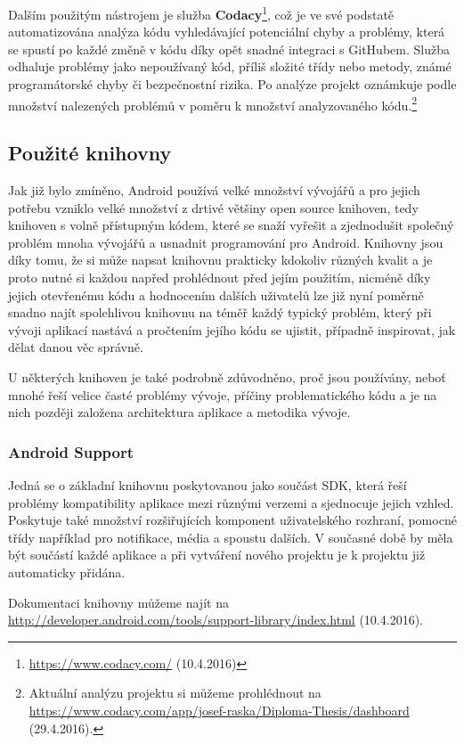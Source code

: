 \documentclass[czech,master,public,dept460,male,java,cpdeclaration]{diploma}
\begin{document}
Dalším použitým nástrojem je služba \textbf{Codacy}\footnote{\url{https://www.codacy.com/} (10.4.2016)}, což je ve své podstatě
automatizována analýza kódu vyhledávající potenciální chyby a problémy, která se spustí po každé změně v kódu
díky opět snadné integraci s GitHubem. Služba odhaluje problémy jako nepoužívaný kód, příliš složité
třídy nebo metody, známé programátorské chyby či bezpečnostní rizika. Po analýze projekt oznámkuje podle
množství nalezených problémů v poměru k množství analyzovaného kódu.\footnote{Aktuální analýzu projektu si můžeme prohlédnout
na \url{https://www.codacy.com/app/josef-raska/Diploma-Thesis/dashboard} (29.4.2016).}

\subsection{Použité knihovny}
Jak již bylo zmíněno, Android používá velké množství vývojářů a pro jejich potřebu vzniklo velké množství
z drtivé většiny open source knihoven, tedy knihoven s volně přístupným kódem,
 které se snaží vyřešit a zjednodušit společný problém mnoha vývojářů
a usnadnit programování pro Android. Knihovny jsou díky tomu, že si může napsat knihovnu prakticky kdokoliv
různých kvalit a je proto nutné si každou napřed prohlédnout před jejím použitím, nicméně díky jejich
otevřenému kódu a hodnocením dalších uživatelů lze již nyní poměrně snadno najít spolehlivou knihovnu na téměř každý
typický problém, který při vývoji aplikací nastává a pročtením jejího kódu se ujistit, případně inspirovat,
jak dělat danou věc správně.

U některých knihoven je také podrobně zdůvodněno, proč jsou používány,
neboť mnohé řeší velice časté problémy vývoje, příčiny problematického kódu a je na nich později založena
architektura aplikace a metodika vývoje.

\subsubsection{Android Support}\label{androidsupport}
Jedná se o základní knihovnu poskytovanou jako součást SDK, která řeší problémy kompatibility aplikace
mezi různými verzemi a sjednocuje jejich vzhled. Poskytuje také množství rozšiřujících komponent uživatelského rozhraní,
pomocné třídy například pro notifikace, média a spoustu dalších. V současné době by měla být součástí každé
aplikace a při vytváření nového projektu je k projektu již automaticky přidána.

Dokumentaci knihovny můžeme najít na \url{http://developer.android.com/tools/support-library/index.html} (10.4.2016).
\end{document}
